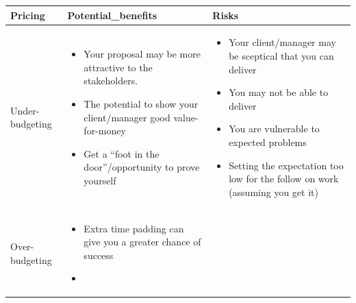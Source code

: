 \documentclass[
]{book}
\providecommand{\tightlist}{%
  \setlength{\itemsep}{0pt}\setlength{\parskip}{0pt}}
\begin{document}
\begin{smaller}

\begin{longtable}[]{@{}lll@{}}
\toprule
\begin{minipage}[b]{0.22\columnwidth}\raggedright
Pricing\strut
\end{minipage} & \begin{minipage}[b]{0.35\columnwidth}\raggedright
Potential\_benefits\strut
\end{minipage} & \begin{minipage}[b]{0.35\columnwidth}\raggedright
Risks\strut
\end{minipage}\tabularnewline
\midrule
\endhead
\begin{minipage}[t]{0.22\columnwidth}\raggedright
Under-budgeting\strut
\end{minipage} & \begin{minipage}[t]{0.35\columnwidth}\raggedright
\begin{itemize}
\tightlist
\item
  Your proposal may be more attractive to the stakeholders.
\item
  The potential to show your client/manager good value-for-money
\item
  Get a ``foot in the door''/opportunity to prove yourself
\end{itemize}\strut
\end{minipage} & \begin{minipage}[t]{0.35\columnwidth}\raggedright
\begin{itemize}
\tightlist
\item
  Your client/manager may be sceptical that you can deliver
\item
  You may not be able to deliver
\item
  You are vulnerable to expected problems
\item
  Setting the expectation too low for the follow on work (assuming you
  get it)
\end{itemize}\strut
\end{minipage}\tabularnewline
\begin{minipage}[t]{0.22\columnwidth}\raggedright
Over-budgeting\strut
\end{minipage} & \begin{minipage}[t]{0.35\columnwidth}\raggedright
\begin{itemize}
\tightlist
\item
  Extra time padding can give you a greater chance of success
\item

\end{itemize}
\end{minipage}
\end{longtable}
\end{smaller}
\end{document}
